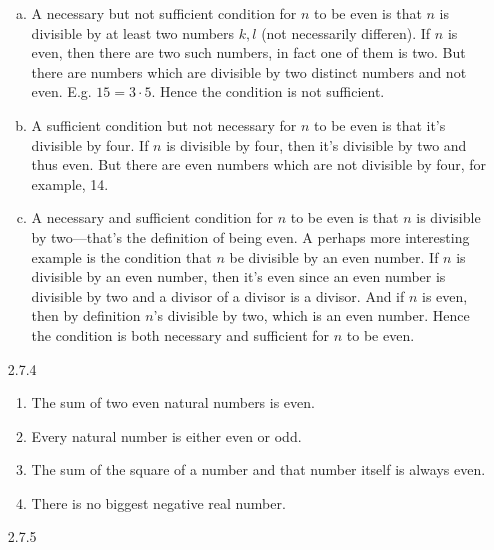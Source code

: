 \begin{enumerate}
			\begin{enumerate}[(a)]
			
				\item A necessary but not sufficient condition for $n$ to be even is that $n$ is divisible by at least two numbers $k,l$ (not necessarily differen). If $n$ is even, then there are two such numbers, in fact one of them is two. But there are numbers which are divisible by two distinct numbers and not even. E.g. $15=3\cdot 5$. Hence the condition is not sufficient.  
				
				\item A sufficient condition but not necessary for $n$ to be even is that it's divisible by four. If $n$ is divisible by four, then it's divisible by two and thus even. But there are even numbers which are not divisible by four, for example, 14.
				
				\item A necessary and sufficient condition for $n$ to be even is that $n$ is divisible by two---that's the definition of being even. A perhaps more interesting example is the condition that $n$ be divisible by an even number. If $n$ is divisible by an even number, then it's even since an even number is divisible by two and a divisor of a divisor is a divisor. And if $n$ is even, then by definition $n$'s divisible by two, which is an even number. Hence the condition is both necessary and sufficient for $n$ to be even.
							
			\end{enumerate}
			
		\item[2.7.4]
		
			\begin{enumerate}
			
				\item The sum of two even natural numbers is even.
				
				\item Every natural number is either even or odd.
				
				\item The sum of the square of a number and that number itself is always even.
				
				\item There is no biggest negative real number.
			
			\end{enumerate}
			
			
		\item[2.7.5] 
		

\end{enumerate}
